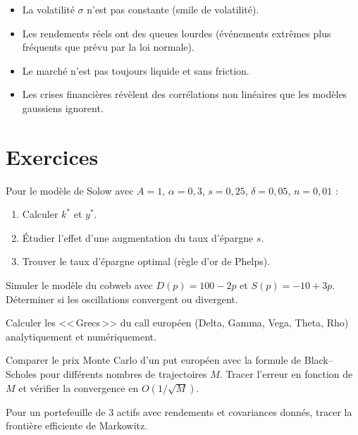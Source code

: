 \begin{attention}[title=\textbf{Limites du mod\`ele de Black--Scholes}]
\begin{itemize}
  \item La volatilit\'e $\sigma$ n'est pas constante (smile de volatilit\'e).
  \item Les rendements r\'eels ont des queues lourdes (\'ev\'enements extr\^emes
    plus fr\'equents que pr\'evu par la loi normale).
  \item Le march\'e n'est pas toujours liquide et sans friction.
  \item Les crises financi\`eres r\'ev\`elent des corr\'elations non
    lin\'eaires que les mod\`eles gaussiens ignorent.
\end{itemize}
\end{attention}

\section{Exercices}

\begin{exercice}
Pour le mod\`ele de Solow avec $A=1$, $\alpha=0{,}3$, $s=0{,}25$,
$\delta=0{,}05$, $n=0{,}01$ :
\begin{enumerate}
  \item Calculer $k^*$ et $y^*$.
  \item \'Etudier l'effet d'une augmentation du taux d'\'epargne $s$.
  \item Trouver le taux d'\'epargne optimal (r\`egle d'or de Phelps).
\end{enumerate}
\end{exercice}

\begin{exercice}
Simuler le mod\`ele du cobweb avec $D(p)=100-2p$ et $S(p)=-10+3p$.
D\'eterminer si les oscillations convergent ou divergent.
\end{exercice}

\begin{exercice}
Calculer les <<\,Grecs\,>> du call europ\'een (Delta, Gamma, Vega,
Theta, Rho) analytiquement et num\'eriquement.
\end{exercice}

\begin{exercice}
Comparer le prix Monte Carlo d'un put europ\'een avec la formule
de Black--Scholes pour diff\'erents nombres de trajectoires $M$.
Tracer l'erreur en fonction de $M$ et v\'erifier la convergence en
$O(1/\sqrt{M})$.
\end{exercice}

\begin{exercice}
Pour un portefeuille de 3 actifs avec rendements et covariances
donn\'es, tracer la fronti\`ere efficiente de Markowitz.
\end{exercice}
